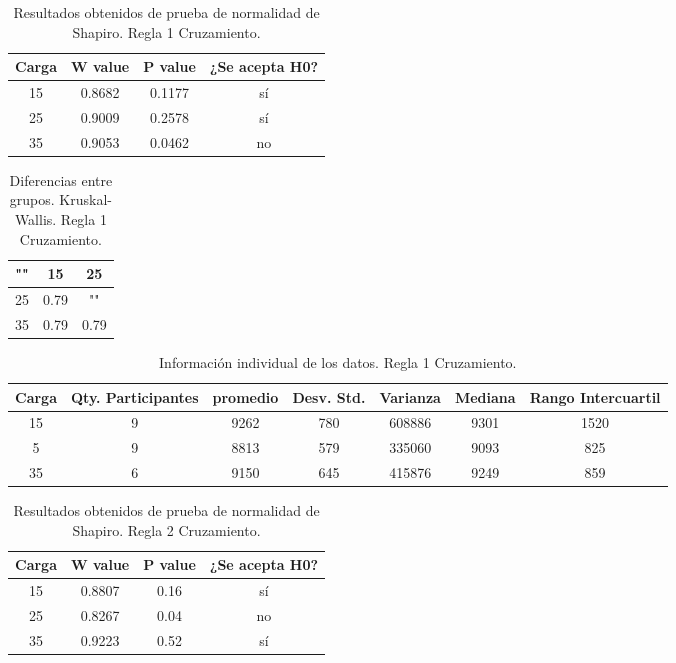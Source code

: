 \documentclass{article}
\begin{document}
\begin{table}[ht]
    \centering
    \caption{Resultados obtenidos de prueba de normalidad de Shapiro. Regla 1 Cruzamiento.} 
    \begin{tabular}{|c|c|c|c|}
    \hline
    Carga & W value & P value & ¿Se acepta H0?  \\
    \hline
    15 & 0.8682 & 0.1177 & s\'i \\
    \hline 
     25 & 0.9009 & 0.2578 & s\'i  \\
    \hline 
    35 & 0.9053 & 0.0462 & no \\
    \hline 
\end{tabular}
    \label{cuadro 1}
\end{table}

\begin{table}[htb]
    \centering
    \caption{Diferencias entre grupos. Kruskal-Wallis. Regla 1 Cruzamiento.} 
    \begin{tabular}{|c|c|c|}
    \hline
    "" & 15 & 25 \\
    \hline
    25 & 0.79 & ""  \\
    \hline
    35 & 0.79 & 0.79  \\
    \hline
\end{tabular}
    \label{cuadro 2}
\end{table}

\begin{table}[htb]
    \centering
    \caption{Informaci\'on individual de los datos. Regla 1 Cruzamiento.} 
    \begin{tabular}{|c|c|c|c|c|c|c|}
    \hline
    Carga & Qty. Participantes & promedio & Desv. Std. & Varianza & Mediana & Rango Intercuartil  \\
    \hline
    15 & 9 & 9262 & 780 & 608886 & 9301 & 1520 \\
    \hline
    5 & 9 & 8813 & 579 & 335060 & 9093 & 825 \\
    \hline
    35 & 6 & 9150 & 645 & 415876 & 9249 & 859 \\
    \hline
\end{tabular}
    \label{cuadro 3}
\end{table}



\begin{table}[ht]
    \centering
    \caption{Resultados obtenidos de prueba de normalidad de Shapiro. Regla 2 Cruzamiento.} 
    \begin{tabular}{|c|c|c|c|}
    \hline
    Carga & W value & P value & ¿Se acepta H0?  \\
    \hline
    15 & 0.8807 & 0.16 & s\'i \\
    \hline 
     25 & 0.8267 & 0.04 &  no \\
    \hline 
    35 & 0.9223 & 0.52 & s\'i \\
    \hline 
\end{tabular}
    \label{cuadro 4}
\end{table}
\end{document}
